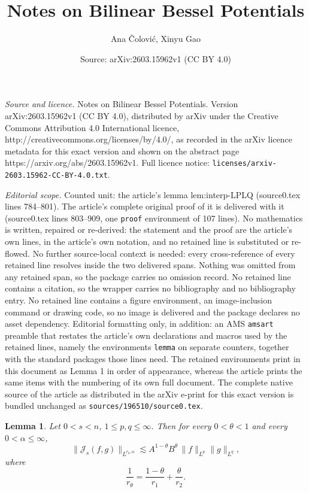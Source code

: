 \documentclass[10pt,a4paper]{amsart}
\title{Notes on Bilinear Bessel Potentials}
\author{Ana \v{C}olovi\'c, Xinyu Gao}
\date{Source: arXiv:2603.15962v1 (CC BY 4.0)}
\newtheorem{lemma}{Lemma}
\begin{document}
\maketitle

\noindent\emph{Source and licence.} Notes on Bilinear Bessel Potentials. Version arXiv:2603.15962v1 (CC BY 4.0), distributed by arXiv under the Creative Commons Attribution 4.0 International licence, http://creativecommons.org/licenses/by/4.0/, as recorded in the arXiv licence metadata for this exact version and shown on the abstract page https://arxiv.org/abs/2603.15962v1. Full licence notice: \texttt{licenses/arxiv-2603.15962-CC-BY-4.0.txt}.\par\smallskip

\noindent\textit{Editorial scope.} Counted unit: the article's lemma lem:interp-LPLQ (source0.tex lines 784--801). The article's complete original proof of it is delivered with it (source0.tex lines 803--909, one \texttt{proof} environment of 107 lines). No mathematics is written, repaired or re-derived: the statement and the proof are the article's own lines, in the article's own notation, and no retained line is substituted or re-flowed.  No further source-local context is needed: every cross-reference of every retained line resolves inside the two delivered spans.  Nothing was omitted from any retained span, so the package carries no omission record.  No retained line contains a citation, so the wrapper carries no bibliography and no bibliography entry.  No retained line contains a figure environment, an image-inclusion command or drawing code, so no image is delivered and the package declares no asset dependency.  Editorial formatting only, in addition: an AMS \texttt{amsart} preamble that restates the article's own declarations and macros used by the retained lines, namely the environments \texttt{lemma} on separate counters, together with the standard packages those lines need.  The retained environments print in this document as Lemma 1 in order of appearance, whereas the article prints the same items with the numbering of its own full document.  The complete native source of the article as distributed in the arXiv e-print for this exact version is bundled unchanged as \texttt{sources/196510/source0.tex}.
\begin{lemma}
\label{lem:interp-LPLQ}
Let $0<s<n$, $1\le p,q\le\infty$.
Then for every $0<\theta<1$ and every $0<\alpha\le\infty$,
\[
\|\mathcal J_s(f,g)\|_{L^{r_\theta,\alpha}}
\lesssim
A^{1-\theta}B^\theta\,\|f\|_{L^p}\|g\|_{L^q},
\]
where
\[
\frac1{r_\theta}
=
\frac{1-\theta}{r_1}
+
\frac{\theta}{r_2}.
\]
\end{lemma}
\end{document}
